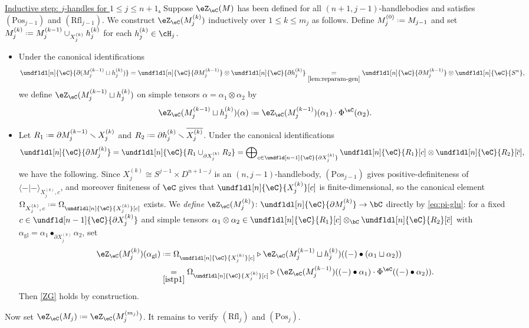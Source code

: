 \documentclass[12pt,reqno]{amsart}
\newcounter{alpha}\renewcommand\thealpha{\upshape\Alph{alpha}}
\newcommand{\glu}{\mathrm{gl}}
\newcommand{\psn}{\Phi}
\newcommand{\C}{\eC}
\newcommand{\Z}{\eZ}
\newcommand{\blt}{\bullet}
\newcommand{\fcj}[1]{\overline{#1}}
\newcommand{\orev}{\overline}
\newcommand{\bkt}[2]{\langle #1|#2 \rangle}
\newcommand{\itemstep}[1]{\smallskip\noindent\underline{#1}}
\renewcommand{\setminus}{\smallsetminus}
\renewcommand{\amalg}{\sqcup}
\DeclareRobustCommand{\coloneq}{\mathrel{\vcenter{\baselineskip0.5ex\lineskiplimit0pt\hbox{\scriptsize{\upshape.}}\hbox{\scriptsize{\upshape.}}}}=}
\begin{document}
\begin{construction}
\itemstep{Inductive step: $j$-handles for $1\leq j\leq n+1$.}
Suppose $\Z_\C(M)$ has been defined for all $(n+1,j-1)$-handlebodies and satisfies $(\mathrm{Pos}_{j-1})$ and $(\mathrm{Rfl}_{j-1})$. We construct $\Z_\C(M_j^{(k)})$ inductively over $1\leq k\leq m_j$ as follows. Define $M_j^{(0)}\coloneq M_{j-1}$ and set $M_j^{(k)}\coloneq M_j^{(k-1)}\cup_{X_j^{(k)}} h_j^{(k)}$ for each $h_j^{(k)}\in \cH_j$. 
\begin{itemize} 
\item Under the canonical identifications
\[
\undfldl[n]{\C}{\partial(M_j^{(k-1)}\amalg h_j^{(k)})}=\undfldl[n]{\C}{\partial M_j^{(k-1)}}\otimes\undfldl[n]{\C}{\partial h_j^{(k)}}
\underset{\eqref{lem:reparam-gen}}=
\undfldl[n]{\C}{\partial M_j^{(k-1)}}\otimes\undfldl[n]{\C}{S^n},
\]
we define $\Z_\C(M_j^{(k-1)}\amalg h_j^{(k)})$ on simple tensors $\alpha=\alpha_1\otimes\alpha_2$ by
\begin{equation}\label{istp1}
\Z_\C(M_j^{(k-1)}\amalg h_j^{(k)})(\alpha)\coloneq\Z_\C(M_j^{(k-1)})(\alpha_1)\cdot\psn^\C(\alpha_2).
\end{equation}
\item Let $R_1\coloneq\partial M_j^{(k-1)}\setminus X_j^{(k)}$ and $R_2\coloneq\partial h_j^{(k)}\setminus\orev{X_j^{(k)}}$.  Under the canonical identifications
\[
\undfldl[n]{\C}{\partial M_j^{(k)}}
=\undfldl[n]{\C}{R_1\cup_{\partial X_j^{(k)}} R_2}
=\bigoplus\nolimits_{c\in\undfld[n-1]{\C}{\partial X_j^{(k)}}} \undfldl[n]{\C}{R_1}[ c]\otimes\undfldl[n]{\C}{R_2}[ \fcj c],
\]
we have the following. Since $X_j^{(k)}\cong S^{j-1}\times D^{n+1-j}$ is an
$(n,j-1)$-handlebody, $(\mathrm{Pos}_{j-1})$ gives
positive-definiteness of $\bkt--_{X_j^{(k)},c}$, and moreover finiteness of $\C$ gives that $\undfldl[n]{\C}{X_j^{(k)}}[c]$ is finite-dimensional, so the canonical element $\Omega_{X^{(k)}_j,\,c}\coloneq\Omega_{\undfldl[n]{\C}{X_j^{(k)}}[c]}$ exists. We \emph{define} $\Z_\C(M_j^{(k)})\colon\undfldl[n]{\C}{\partial M_j^{(k)}}\to\bC$ directly by \eqref{eq:pi-glu}: for a fixed $c\in\undfld[n-1]{\C}{\partial X_j^{(k)}}$ and simple tensors $\alpha_1\otimes\alpha_2 \in \undfldl[n]{\C}{R_1}[ c]\otimes_\bC\undfldl[n]{\C}{R_2}[ \fcj c]$ with $\alpha_\glu =\alpha_1\blt_{\partial X_j^{(k)}}\alpha_2$, set
\begin{align*}
\Z_\C(M_j^{(k)})(\alpha_\glu)
&\coloneq
\Omega_{\undfldl[n]{\C}{X_j^{(k)}}[c]}\triangleright\Z_\C(M_j^{(k-1)}\amalg h_j^{(k)})((-)\blt(\alpha_1\amalg\alpha_2)) \\
&\underset{\eqref{istp1}}=
\Omega_{\undfldl[n]{\C}{X_j^{(k)}}[c]}\triangleright(\Z_\C(M_j^{(k-1)})((-)\blt\alpha_1)\cdot\psn^\C((-)\blt\alpha_2)).
\end{align*}
Then \ref{ZG} holds by construction.
\end{itemize}
Now set $\Z_\C(M_j)\coloneq \Z_\C(M_j^{(m_j)})$. It remains to verify $(\mathrm{Rfl}_j)$ and $(\mathrm{Pos}_j)$.


\end{construction}
\end{document}
